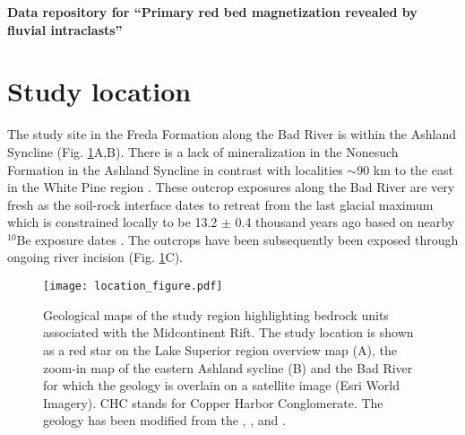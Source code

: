 \documentclass[11pt,letterpaper]{article}
\begin{document}
\begin{flushleft}
{\Large \textbf{Data repository for ``Primary red bed magnetization revealed by fluvial intraclasts''}}

\end{flushleft}

\section*{Study location}
The study site in the Freda Formation along the Bad River is within the Ashland Syncline (Fig. \ref{fig:location_figure}A,B). There is a lack of mineralization in the Nonesuch Formation in the Ashland Syncline in contrast with localities $\sim$90 km to the east in the White Pine region \citep{Stewart2017a}. These outcrop exposures along the Bad River are very fresh as the soil-rock interface dates to retreat from the last glacial maximum which is constrained locally to be 13.2 $\pm$ 0.4 thousand years ago based on nearby $^{10}$Be exposure dates \citep{Ullman2015a}. The outcrops have been subsequently been exposed through ongoing river incision (Fig. \ref{fig:location_figure}C).

\begin{figure}[!ht]
\noindent\texttt{[image: location\_figure.pdf]}
\caption{\small{Geological maps of the study region highlighting bedrock units associated with the Midcontinent Rift. The study location is shown as a red star on the Lake Superior region overview map (A), the zoom-in map of the eastern Ashland sycline (B) and the Bad River for which the geology is overlain on a satellite image (Esri World Imagery\nocite{Esria}). CHC stands for Copper Harbor Conglomerate. The geology has been modified from the \cite{Survey2011a}, \cite{Nicholson2004a}, and \cite{Jirsa2011a}.}}
\label{fig:location_figure}
\end{figure} 

\singlespacing

\newpage



\end{document}
